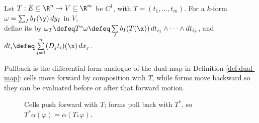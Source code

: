 \begin{definition} \label{def:pullback-of-differential-form} \\
Let $T:E\subseteq\R^n\to V\subseteq\R^m$ be $C^1$, with $T=(t_1,\ldots,t_m)$. For a $k$-form $\omega=\sum_I b_I(\y)\,dy_I$ in $V$,\\
define its  by $\omega_T\defeq T^\ast\omega\defeq \sum\limits_I b_I(T(\x))\,dt_{i_1}\wedge\cdots\wedge dt_{i_k}$, and $dt_i\defeq\sum\limits_{j=1}^{n}(D_jt_i)(\x)\,dx_j$.
\end{definition}

Pullback is the differential-form analogue of the dual map in Definition \ref{def:dual-map}: cells move forward by composition with $T$, while forms move backward so they can be evaluated before or after that forward motion.

\begin{figure}[H]
  \centering
  
  \caption{Cells push forward with $T$; forms pull back with $T^\ast$, so $T^\ast\alpha(\varphi)=\alpha(T_\ast\varphi)$.}
  \label{fig:forms-pushforward-pullback-duality}
\end{figure}

